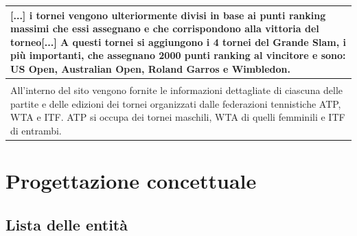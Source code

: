 \documentclass[10pt]{article}
\begin{document}
\begin{xtabular}{|p{\textwidth}|}
    [...] i tornei vengono ulteriormente divisi in base ai punti ranking massimi che essi assegnano e che corrispondono alla vittoria del torneo[...] A questi tornei si aggiungono i 4 tornei del Grande Slam, i più importanti, che assegnano 2000 punti ranking al vincitore e sono: US Open, Australian Open, Roland Garros e Wimbledon.\\
    \hline
      \\ 
    \hline
    All’interno del sito vengono fornite le informazioni dettagliate di ciascuna delle partite e delle edizioni dei tornei organizzati dalle federazioni tennistiche ATP, WTA e ITF. ATP si occupa dei tornei maschili, WTA di quelli femminili e ITF di entrambi.\\
    \hline
\end{xtabular}

\section{Progettazione concettuale}

\subsection{Lista delle entità}
\end{document}
